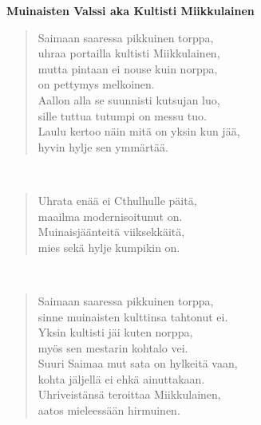 \noindent\begin{minipage}{\linewidth}
\vspace{5pt}
\parbox[t]{0.85\linewidth}{\raggedright {\large\bf Muinaisten Valssi aka Kultisti Miikkulainen}\\[6pt]}
\begin{verse}
	Saimaan saaressa pikkuinen torppa,\\
	uhraa portailla kultisti Miikkulainen,\\
	mutta pintaan ei nouse kuin norppa,\\
	on pettymys melkoinen.\\
	Aallon alla se suunnisti kutsujan luo,\\
	sille tuttua tutumpi on messu tuo.\\
	Laulu kertoo näin mitä on yksin kun jää,\\
	hyvin hylje sen ymmärtää.\\
\end{verse}
\end{minipage}\\[10pt]
\noindent\begin{minipage}{\linewidth}
\begin{verse}
	Uhrata enää ei Cthulhulle päitä,\\
	maailma modernisoitunut on.\\
	Muinaisjäänteitä viiksekkäitä,\\
	mies sekä hylje kumpikin on.\\
\end{verse}
\end{minipage}\\[10pt]
\noindent\begin{minipage}{\linewidth}
\begin{verse}
	Saimaan saaressa pikkuinen torppa,\\
	sinne muinaisten kulttinsa tahtonut ei.\\
	Yksin kultisti jäi kuten norppa,\\
	myös sen mestarin kohtalo vei.\\
	Suuri Saimaa mut sata on hylkeitä vaan,\\
	kohta jäljellä ei ehkä ainuttakaan.\\
	Uhriveistänsä teroittaa Miikkulainen,\\
	aatos mieleessään hirmuinen.\\
\end{verse}
\end{minipage}\\[10pt]
